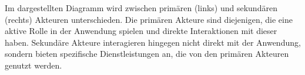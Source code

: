 Im dargestellten Diagramm wird zwischen primären (links) und sekundären (rechts) Akteuren unterschieden.
Die primären Akteure sind diejenigen, die eine aktive Rolle in der Anwendung spielen und direkte Interaktionen mit dieser haben.
Sekundäre Akteure interagieren hingegen nicht direkt mit der Anwendung, sondern bieten spezifische Dienstleistungen an, die von den primären Akteuren genutzt werden.